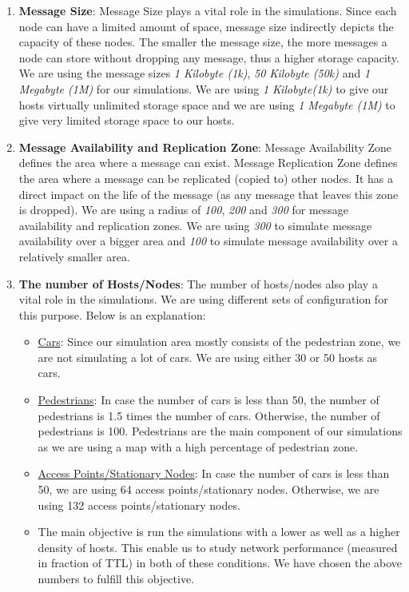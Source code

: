 \begin{enumerate}
	\item \textbf{Message Size}: Message Size plays a vital role in the simulations. Since each node can have a limited amount of space, message size indirectly depicts the capacity of these nodes. The smaller the message size, the more messages a node can store without dropping any message, thus a higher storage capacity. We are using the message sizes \textit{1 Kilobyte (1k)}, \textit{50 Kilobyte (50k)} and \textit{1 Megabyte (1M)} for our simulations. We are using \textit{1 Kilobyte(1k)} to give our hosts virtually unlimited storage space and we are using \textit{1 Megabyte (1M)} to give very limited storage space to our hosts.
	\item \textbf{Message Availability and Replication Zone}: Message Availability Zone defines the area where a message can exist. Message Replication Zone defines the area where a message can be replicated (copied to) other nodes. It has a direct impact on the life of the message (as any message that leaves this zone is dropped). We are using a radius of \textit{100}, \textit{200} and \textit{300} for message availability and replication zones. We are using \textit{300} to simulate message availability over a bigger area and \textit{100} to simulate message availability over a relatively smaller area.
	\item \textbf{The number of Hosts/Nodes}: The number of hosts/nodes also play a vital role in the simulations. We are using different sets of configuration for this purpose. Below is an explanation:
		\begin{itemize}
			\item \underline{Cars}: Since our simulation area mostly consists of the pedestrian zone, we are not simulating a lot of cars. We are using either 30 or 50 hosts as cars.
			\item \underline{Pedestrians}: In case the number of cars is less than 50, the number of pedestrians is 1.5 times the number of cars. Otherwise, the number of pedestrians is 100. Pedestrians are the main component of our simulations as we are using a map with a high percentage of pedestrian zone.
			\item \underline{Access Points/Stationary Nodes}: In case the number of cars is less than 50, we are using 64 access points/stationary nodes. Otherwise, we are using 132 access points/stationary nodes.
      \item The main objective is run the simulations with a lower as well as a higher density of hosts. This enable us to study network performance (measured in fraction of TTL) in both of these conditions. We have chosen the above numbers to fulfill this objective.
		\end{itemize}
\end{enumerate}


